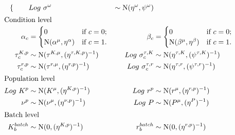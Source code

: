 \documentclass[11pt,a4paper]{article}
\begin{document}
\begin{align*}
\begin{cases}
\end{cases}
\qquad
&Log~\sigma^{\omega}&\sim
\operatorname{N}(\eta^{\omega},\psi^{\omega})
\\
\intertext{Condition level}
\alpha_{c}&=\begin{cases}
0  & \text{if } c=0;\\
\operatorname{N}(\alpha^{\mu},\eta^{\alpha})  & \text{if } c=1.
\end{cases}
&\beta_{c}&=\begin{cases}
0  & \text{if } c=0;\\
\operatorname{N}(\beta^{\mu},\eta^{\beta}) & \text{if } c=1.
\end{cases}
\\
\tau^{K,p}_{c} &\sim \operatorname{N}(\tau^{K,\mu}, ({\eta^{\tau,K,p}})^{-1} )
& Log~\sigma^{\tau,K}_{c} &\sim \operatorname{N}(\eta^{\tau,K}, (\psi^{\tau,K})^{-1} )\\
\tau^{r,p}_{c} &\sim \operatorname{N}(\tau^{r,\mu}, ({\eta^{r,p}})^{-1} )
& Log~\sigma^{\tau,r}_{c} &\sim \operatorname{N}(\eta^{\tau,r}, (\psi^{\tau,r})^{-1} )\\
\intertext{Population level}
Log~K^p &\sim \operatorname{N}(K^\mu, ({\eta^{K,p}})^{-1} )
& Log~r^p &\sim \operatorname{N}(r^\mu, ({\eta^{r,p}})^{-1} )\\
\nu^p &\sim \operatorname{N}(\nu^\mu, ({\eta}^{\nu,p})^{-1} )
& Log~P &\sim \operatorname{N}(P^\mu, ({\eta^{P}})^{-1} )\\
\intertext{Batch level}
K^{batch}_{b}&\sim \operatorname{N}(0, ({\eta^{K,p}})^{-1} )
& r^{batch}_{b}&\sim  \operatorname{N}(0, ({\eta^{r,p}})^{-1} )\\
\end{align*}
\end{document}
